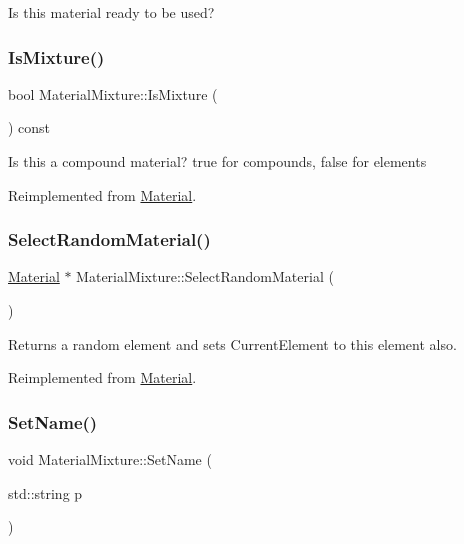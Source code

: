 Is this material ready to be used? \mbox{\label{classMaterialMixture_ac9ff85c8bc6ea548e91b35f10c312f74}} 
\subsubsection{\texorpdfstring{Is\+Mixture()}{IsMixture()}}
{\footnotesize\ttfamily bool Material\+Mixture\+::\+Is\+Mixture (\begin{DoxyParamCaption}{ }\end{DoxyParamCaption}) const\hspace{0.3cm}{\ttfamily [virtual]}}

Is this a compound material? true for compounds, false for elements 

Reimplemented from \hyperlink{classMaterial}{Material}.

\mbox{\label{classMaterialMixture_af13d1230726a4b35b8bbe877f6322ca5}} 
\subsubsection{\texorpdfstring{Select\+Random\+Material()}{SelectRandomMaterial()}}
{\footnotesize\ttfamily \hyperlink{classMaterial}{Material} $\ast$ Material\+Mixture\+::\+Select\+Random\+Material (\begin{DoxyParamCaption}{ }\end{DoxyParamCaption})\hspace{0.3cm}{\ttfamily [virtual]}}

Returns a random element and sets Current\+Element to this element also. 

Reimplemented from \hyperlink{classMaterial}{Material}.

\mbox{\label{classMaterialMixture_ad6e1e1e953197836fc0252ea5d4aa393}} 
\subsubsection{\texorpdfstring{Set\+Name()}{SetName()}}
{\footnotesize\ttfamily void Material\+Mixture\+::\+Set\+Name (\begin{DoxyParamCaption}\item[{std\+::string}]{p }\end{DoxyParamCaption})\hspace{0.3cm}{\ttfamily [virtual]}}

